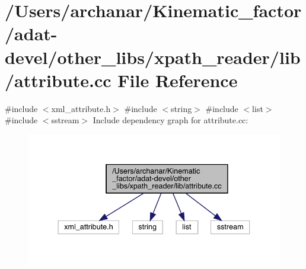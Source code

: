 \hypertarget{adat-devel_2other__libs_2xpath__reader_2lib_2attribute_8cc}{}\section{/\+Users/archanar/\+Kinematic\+\_\+factor/adat-\/devel/other\+\_\+libs/xpath\+\_\+reader/lib/attribute.cc File Reference}
\label{adat-devel_2other__libs_2xpath__reader_2lib_2attribute_8cc}
{\ttfamily \#include $<$xml\+\_\+attribute.\+h$>$}\newline
{\ttfamily \#include $<$string$>$}\newline
{\ttfamily \#include $<$list$>$}\newline
{\ttfamily \#include $<$sstream$>$}\newline
Include dependency graph for attribute.\+cc\+:
\nopagebreak
\begin{figure}[H]
\begin{center}
\leavevmode
\includegraphics[width=337pt]{d0/d13/adat-devel_2other__libs_2xpath__reader_2lib_2attribute_8cc__incl}
\end{center}
\end{figure}

